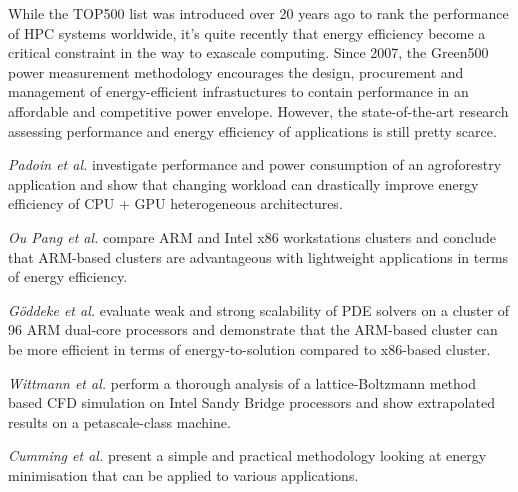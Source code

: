 While the  TOP500 list was  introduced over 20  years ago to  rank the
performance of HPC systems  worldwide, it's quite recently that energy
efficiency  become  a  critical  constraint  in the  way  to  exascale
computing.   Since 2007,  the Green500  power  measurement methodology
encourages the design,  procurement and management of energy-efficient
infrastuctures to contain performance in an affordable and competitive
power  envelope.   However,  the state-of-the-art  research  assessing
performance  and energy  efficiency  of applications  is still  pretty
scarce.

\emph{Padoin et al.}   \citep{Padoin-2013} investigate performance and
power  consumption  of  an  agroforestry  application  and  show  that
changing workload  can drastically improve energy efficiency  of CPU +
GPU heterogeneous architectures.

\emph{Ou  Pang et  al.}   \citep{Ou-2012} compare  ARM  and Intel  x86
workstations  clusters  and   conclude  that  ARM-based  clusters  are
advantageous  with   lightweight  applications  in   terms  of  energy
efficiency.

\emph{G\"oddeke et al.}  \citep{Goddeke-2013} evaluate weak and strong
scalability of PDE solvers on a cluster of 96 ARM dual-core processors
and demonstrate  that the ARM-based  cluster can be more  efficient in
terms of energy-to-solution compared to x86-based cluster.

\emph{Wittmann  et  al.}   \citep{Wittmann-2013}  perform  a  thorough
analysis of  a lattice-Boltzmann method based CFD  simulation on Intel
Sandy   Bridge  processors   and  show   extrapolated  results   on  a
petascale-class machine.

\emph{Cumming  et  al.}   \citep{Cumming-2014}  present a  simple  and
practical  methodology  looking at  energy  minimisation  that can  be
applied to various applications.
